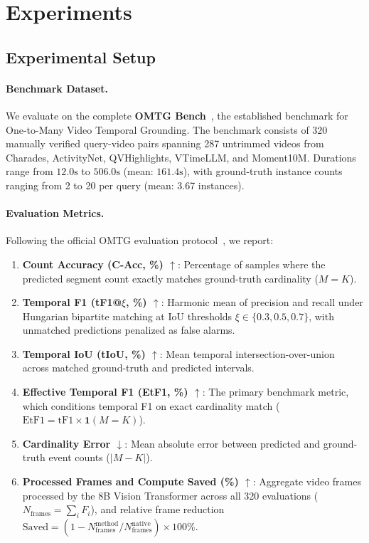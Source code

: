 \section{Experiments}
\label{sec:experiments}

\subsection{Experimental Setup}
\label{sec:exp_setup}

\paragraph{Benchmark Dataset.} We evaluate on the complete \textbf{OMTG Bench}~\cite{omtg2026}, the established benchmark for One-to-Many Video Temporal Grounding. The benchmark consists of 320 manually verified query-video pairs spanning 287 untrimmed videos from Charades, ActivityNet, QVHighlights, VTimeLLM, and Moment10M. Durations range from $12.0\text{s}$ to $506.0\text{s}$ (mean: $161.4\text{s}$), with ground-truth instance counts ranging from 2 to 20 per query (mean: 3.67 instances).

\paragraph{Evaluation Metrics.} Following the official OMTG evaluation protocol~\cite{omtg2026}, we report:
\begin{enumerate}
    \item \textbf{Count Accuracy (C-Acc, \%) $\uparrow$}: Percentage of samples where the predicted segment count exactly matches ground-truth cardinality ($M=K$).
    \item \textbf{Temporal F1 (tF1@$\xi$, \%) $\uparrow$}: Harmonic mean of precision and recall under Hungarian bipartite matching at IoU thresholds $\xi \in \{0.3, 0.5, 0.7\}$, with unmatched predictions penalized as false alarms.
    \item \textbf{Temporal IoU (tIoU, \%) $\uparrow$}: Mean temporal intersection-over-union across matched ground-truth and predicted intervals.
    \item \textbf{Effective Temporal F1 (EtF1, \%) $\uparrow$}: The primary benchmark metric, which conditions temporal F1 on exact cardinality match ($\text{EtF1} = \text{tF1} \times \mathbf{1}(M=K)$).
    \item \textbf{Cardinality Error $\downarrow$}: Mean absolute error between predicted and ground-truth event counts ($|M - K|$).
    \item \textbf{Processed Frames and Compute Saved (\%) $\uparrow$}: Aggregate video frames processed by the 8B Vision Transformer across all 320 evaluations ($N_{\text{frames}} = \sum_i F_i$), and relative frame reduction $\text{Saved} = (1 - N_{\text{frames}}^{\text{method}} / N_{\text{frames}}^{\text{native}}) \times 100\%$.
\end{enumerate}

